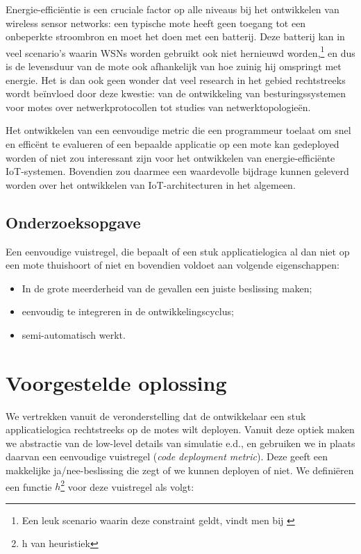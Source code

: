 \documentclass[11pt]{article}
\begin{document}
Energie-effici\"entie is een cruciale factor op alle niveaus bij het ontwikkelen
van wireless sensor networks: een typische mote heeft geen toegang tot een
onbeperkte stroombron en moet het doen met een batterij. Deze batterij kan in
veel scenario's waarin WSNs worden gebruikt ook niet hernieuwd
worden,\footnote{Een leuk scenario waarin deze constraint geldt, vindt men bij
\cite{mainwaring2002wireless}} en dus is de levensduur van de mote ook
afhankelijk van hoe zuinig hij omspringt met energie. Het is dan ook geen wonder
dat veel research in het gebied rechtstreeks wordt be\"invloed door deze
kwestie: van de ontwikkeling van besturingssystemen voor motes over
netwerkprotocollen tot studies van netwerktopologie\"en.

Het ontwikkelen van een eenvoudige metric die een programmeur toelaat om snel en
effic\"ent te evalueren of een bepaalde applicatie op een mote kan gedeployed
worden of niet zou interessant zijn voor het ontwikkelen van
energie-effici\"ente IoT-systemen. Bovendien zou daarmee een waardevolle
bijdrage kunnen geleverd worden over het ontwikkelen van IoT-architecturen in
het algemeen.

\subsection{Onderzoeksopgave}

Een eenvoudige vuistregel, die bepaalt of een stuk applicatielogica al dan niet op een mote thuishoort of niet en bovendien voldoet aan volgende eigenschappen:
\begin{itemize}
\item In de grote meerderheid van de gevallen een juiste beslissing maken;
\item eenvoudig te integreren in de ontwikkelingscyclus;
\item semi-automatisch werkt.
\end{itemize}

\section{Voorgestelde oplossing}
We vertrekken vanuit de veronderstelling dat de ontwikkelaar een stuk
applicatielogica rechtstreeks op de motes wilt deployen. Vanuit deze optiek
maken we abstractie van de low-level details van simulatie e.d., en gebruiken we
in plaats daarvan een eenvoudige vuistregel (\textit{code deployment
metric}). Deze geeft een makkelijke ja/nee-beslissing die zegt of we kunnen
deployen of niet. We defini\"eren een functie $h$\footnote{h van heuristiek} voor deze vuistregel als
volgt:
\end{document}
